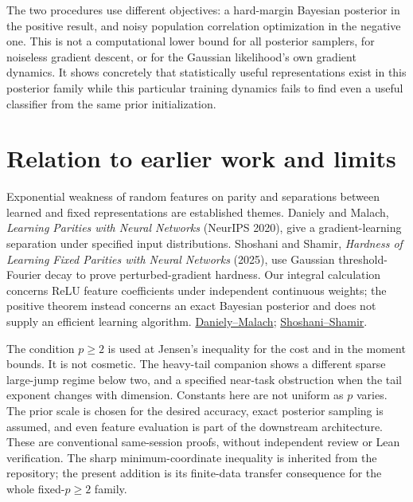\documentclass[11pt]{article}
\begin{document}
The two procedures use different objectives: a hard-margin Bayesian
posterior in the positive result, and noisy population correlation
optimization in the negative one. This is not a computational lower
bound for all posterior samplers, for noiseless gradient descent, or for
the Gaussian likelihood's own gradient dynamics. It shows concretely
that statistically useful representations exist in this posterior
family while this particular training dynamics fails to find even a
useful classifier from the same prior initialization.

\section*{Relation to earlier work and limits}
Exponential weakness of random features on parity and separations between
learned and fixed representations are established themes.
Daniely and Malach, \emph{Learning Parities with Neural Networks}
(NeurIPS 2020), give a gradient-learning separation under specified input
distributions. Shoshani and Shamir, \emph{Hardness of Learning Fixed
Parities with Neural Networks} (2025), use Gaussian threshold-Fourier
decay to prove perturbed-gradient hardness. Our integral calculation
concerns ReLU feature coefficients under independent continuous weights;
the positive theorem instead concerns an exact Bayesian posterior and
does not supply an efficient learning algorithm.
\href{https://proceedings.neurips.cc/paper/2020/file/eaae5e04a259d09af85c108fe4d7dd0c-Paper.pdf}{Daniely--Malach};
\href{https://arxiv.org/abs/2501.00817}{Shoshani--Shamir}.

The condition $p\ge2$ is used at Jensen's inequality for the cost and
in the moment bounds. It is not cosmetic. The heavy-tail companion
shows a different sparse large-jump regime below two, and a specified
near-task obstruction when the tail exponent changes with dimension.
Constants here are not uniform as $p$ varies. The prior scale is chosen
for the desired accuracy, exact posterior sampling is assumed, and
even feature evaluation is part of the downstream architecture.
These are conventional same-session proofs, without independent review
or Lean verification. The sharp minimum-coordinate inequality is inherited
from the repository; the present addition is its finite-data transfer
consequence for the whole fixed-$p\ge2$ family.
\end{document}
